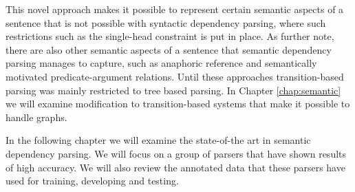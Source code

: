 This novel approach makes it possible to represent certain semantic aspects of a sentence that is not possible with syntactic dependency parsing, where such restrictions such as the single-head constraint is put in place. As  further note, there are also other semantic aspects of a sentence that semantic dependency parsing manages to capture, such as anaphoric reference and semantically motivated predicate-argument relations. Until these approaches transition-based parsing was mainly restricted to tree based parsing. In Chapter \ref{chap:semantic} we will examine modification to transition-based systems that make it possible to handle graphs. 

In the following chapter we will examine the state-of-the art in semantic dependency parsing. We will focus on a group of parsers that have shown results of high accuracy. We will also review the annotated data that these parsers have used for training, developing and testing.